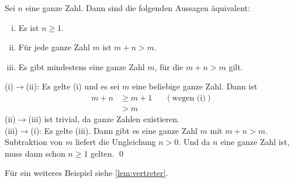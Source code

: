  \begin{bsp}
Sei $n$ eine ganze Zahl. Dann sind die folgenden Aussagen äquivalent:
\begin{enumerate}[(i)]
 \item Es ist $n\geq 1$.
 \item Für jede ganze Zahl $m$ ist $m+n>m$.
 \item Es gibt mindestens eine ganze Zahl $m$, für die $m+n>m$ gilt.
\end{enumerate}
 \end{bsp}
\begin{bew}
(i)$\to$(ii): Es gelte (i) und es sei $m$ eine beliebige ganze Zahl. Dann ist
\begin{align*}
 m+n & \geq m+1 && (\text{wegen (i)}) \\
 & > m
\end{align*}
(ii)$\to$(iii) ist trivial, da ganze Zahlen existieren. \\[0.5em]
(iii)$\to$(i): Es gelte (iii). Dann gibt es eine ganze Zahl $m$ mit $m+n>m$. Subtraktion von $m$ liefert die Ungleichung $n>0$. Und da $n$ eine ganze Zahl ist, muss dann schon $n\geq 1$ gelten. \qed
\end{bew}

Für ein weiteres Beispiel siehe \cref{lem:vertreter}.


